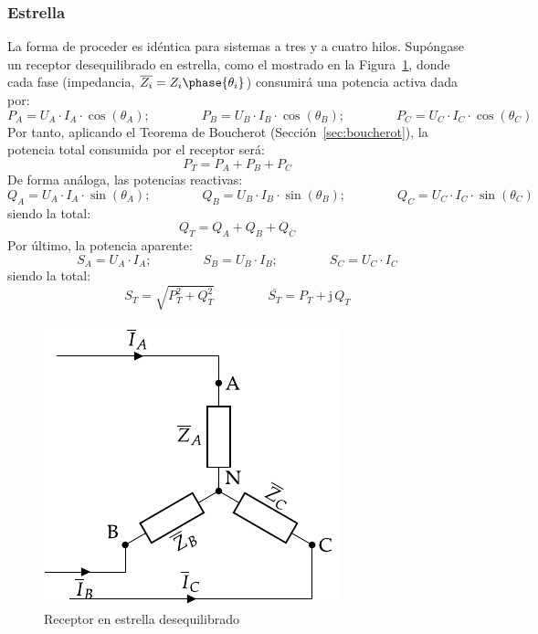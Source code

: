 	\subsubsection{Estrella}
	La forma de proceder es idéntica para sistemas a tres y a cuatro hilos. Supóngase un receptor desequilibrado en estrella, como el mostrado en la Figura~\ref{fig:estrellaDesequilibrado_potencia}, donde cada fase (impedancia, $\overline{Z_i}=Z_i\phase{\theta_i}$) consumirá una potencia activa dada por: 
	\begin{equation*}
	    P_A=U_{A}\cdot I_A \cdot \cos(\theta_A);\qquad \qquad
	    P_B=U_{B}\cdot I_B \cdot \cos(\theta_B);\qquad \qquad
	    P_C=U_{C}\cdot I_C \cdot \cos(\theta_C)
	\end{equation*}
	Por tanto, aplicando el Teorema de Boucherot (Sección~\ref{sec:boucherot}), la potencia total consumida por el receptor será:
	\begin{equation}
	    \boxed{P_T=P_A+P_B+P_C}
	\end{equation}
	De forma análoga, las potencias reactivas:
	\begin{equation*}
	    Q_A=U_{A}\cdot I_A \cdot \sin(\theta_A);\qquad \qquad
	    Q_B=U_{B}\cdot I_B \cdot \sin(\theta_B);\qquad \qquad
	    Q_C=U_{C}\cdot I_C \cdot \sin(\theta_C)
	\end{equation*}
	siendo la total: 
	\begin{equation}
	    \boxed{Q_T=Q_A+Q_B+Q_C}
	\end{equation}
	Por último, la potencia aparente: 
	\begin{equation*}
	    S_A=U_{A}\cdot I_A;\qquad \qquad
	    S_B=U_{B}\cdot I_B;\qquad \qquad
	    S_C=U_{C}\cdot I_C
	\end{equation*}
	siendo la total: 
	\begin{equation}
	    \boxed{S_T=\sqrt{P_T^2+Q_T^2}}\,\qquad\qquad \boxed{\overline{S_T}=P_T+\mathrm{j}\,Q_T}
	\end{equation}
	
	\begin{figure}[H]
	    \centering
	    \includegraphics{../figs/EstrellaDesequilibrado_Receptor_SN.pdf}
	    \caption{Receptor en estrella desequilibrado}
	    \label{fig:estrellaDesequilibrado_potencia}
	\end{figure}
	
